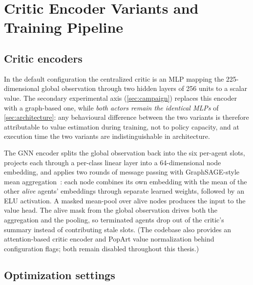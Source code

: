 \section{Critic Encoder Variants and Training Pipeline}
\label{sec:critic-variants}

\subsection{Critic encoders}
\label{sec:critic-encoders}

In the default configuration the centralized critic is an MLP mapping the
225-dimensional global observation through two hidden layers of 256 units
to a scalar value. The secondary experimental axis
(\cref{sec:campaign}) replaces this encoder with a graph-based one, while
\emph{both actors remain the identical MLPs} of \cref{sec:architecture}:
any behavioural difference between the two variants is therefore
attributable to value estimation during training, not to policy capacity,
and at execution time the two variants are indistinguishable in
architecture.

The GNN encoder splits the global observation back into the six per-agent
slots, projects each through a per-class linear layer into a
64-dimensional node embedding, and applies two rounds of message passing
with GraphSAGE-style mean aggregation~\cite{hamilton2017graphsage}: each
node combines its own embedding with the mean of the other \emph{alive}
agents' embeddings through separate learned weights, followed by an ELU
activation. A masked mean-pool over alive nodes produces the input to the
value head. The alive mask from the global observation drives both the
aggregation and the pooling, so terminated agents drop out of the
critic's summary instead of contributing stale slots. (The codebase also
provides an attention-based critic encoder and PopArt value
normalization behind configuration flags; both remain disabled throughout
this thesis.)

\subsection{Optimization settings}
\label{sec:optimization}

